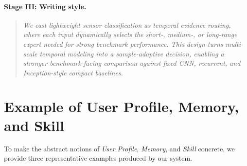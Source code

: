 \documentclass{opendatalab}
\begin{document}
\paragraph{Stage III: Writing style.}
\begin{quote}
\itshape
We cast lightweight sensor classification as temporal evidence routing,
where each input dynamically selects the short-, medium-, or long-range
expert needed for strong benchmark performance. This design turns
multi-scale temporal modeling into a sample-adaptive decision, enabling a
stronger benchmark-facing comparison against fixed CNN, recurrent, and
Inception-style compact baselines.
\end{quote}

\section{Example of User Profile, Memory, and Skill}
\label{app:profile_example}

To make the abstract notions of \textit{User Profile}, \textit{Memory}, 
and \textit{Skill} concrete, we provide three representative examples 
produced by our system.
\end{document}
